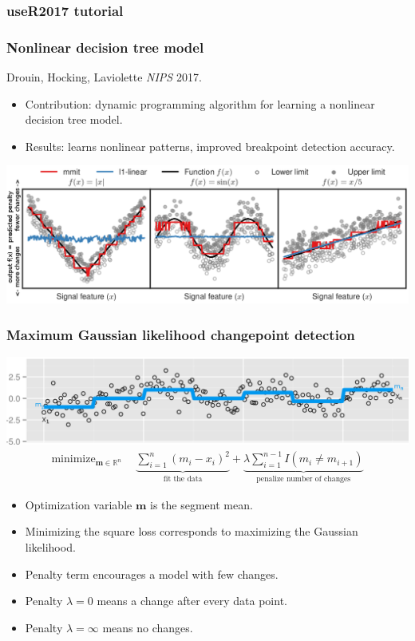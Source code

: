 \documentclass{beamer}
\DeclareMathOperator*{\minimize}{minimize}
\newcommand{\RR}{\mathbb R}
\begin{document}
\begin{frame}
  \frametitle{useR2017 tutorial}
  
\end{frame}

\begin{frame}
  \frametitle{Nonlinear decision tree model}
  Drouin, Hocking, Laviolette {\it NIPS} 2017.
  \begin{itemize}
  \item Contribution: dynamic programming algorithm for learning a
    nonlinear decision tree model.
  \item Results: learns nonlinear patterns, improved
    breakpoint detection accuracy.
  \end{itemize}

\includegraphics[width=\textwidth]{screenshot-mmit-learned}
\end{frame}

\begin{frame}
  \frametitle{Maximum Gaussian likelihood changepoint detection}

\includegraphics[width=\textwidth]{seg-mean}
\begin{align*}
    \minimize_{
  \mathbf m\in\RR^{n}
} &\ \ 
    \underbrace{
    \sum_{i=1}^n ( m_i - x_i)^2
}_{\text{fit the data}} + 
\underbrace{\lambda
\sum_{i=1}^{n-1} I(m_i\neq m_{i+1})}_{
\text{penalize number of changes}
}
\end{align*}

\begin{itemize}
\item Optimization variable $\mathbf m$ is the segment mean.
\item Minimizing the square loss corresponds to maximizing the
  Gaussian likelihood.
\item Penalty term encourages a model with few changes.
\item Penalty $\lambda=0$ means a change after every data point.
\item Penalty $\lambda=\infty$ means no changes.
\end{itemize}
\end{frame}
\end{document}
